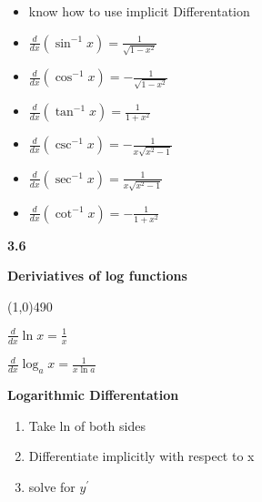 \documentclass{report}
\begin{document}
   \bigbreak \noindent  
   \begin{mdframed}
       \begin{itemize}
           \item know how to use implicit Differentation
       \end{itemize}
   \end{mdframed}

   \pagebreak \bigbreak \noindent
   \begin{mdframed}
       \begin{itemize}
          \item $\frac{d}{dx}(\sin^{-1}{x}) = \frac{1}{\sqrt{1-x^{2}}}$ 
          \item $\frac{d}{dx}(\cos^{-1}{x}) = -\frac{1}{\sqrt{1-x^{2}}}$ 
          \item $\frac{d}{dx}(\tan^{-1}{x}) = \frac{1}{1+x^{2}}$ 
          \item $\frac{d}{dx}(\csc^{-1}{x}) = -\frac{1}{x\sqrt{x^{2}-1}}$ 
          \item $\frac{d}{dx}(\sec^{-1}{x}) = \frac{1}{x\sqrt{x^{2}-1}}$ 
          \item $\frac{d}{dx}(\cot^{-1}{x}) = -\frac{1}{1+x^{2}}$ 
        \end{itemize}
    \end{mdframed}

    \bigbreak \noindent 
    \begin{Large}
        \begin{mdframed}
            \begin{center}
                \textbf{3.6}
            \end{center}
        \end{mdframed}
    \end{Large}
    \begin{Large}
        \begin{center}
            \textbf{Deriviatives of log functions}
        \end{center}
    \end{Large}
    \line(1,0){490}
    
    \bigbreak \noindent 
    \begin{mdframed}
        \item $\frac{d}{dx}\ln{x} = \frac{1}{x}$ 
        \item $\frac{d}{dx}\log_a{x} = \frac{1}{x\ln{a}}$
    \end{mdframed}

    \bigbreak \noindent 
    \begin{mdframed}
        \textbf{Logarithmic Differentation}
        \begin{enumerate}
            \item Take ln of both sides
            \item Differentiate implicitly with respect to x
            \item solve for $y^{\prime}$
        \end{enumerate}
    \end{mdframed}
    
\end{document}
